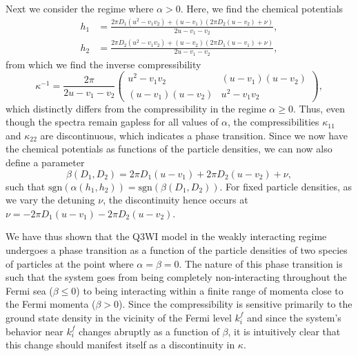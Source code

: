 \documentclass[aps,pra,
superscriptaddress,
reprint,twocolumn,preprintnumbers,
amsmath,amssymb,
nofootinbib]{revtex4-1}
\begin{document}
Next we consider the regime where $\alpha>0$. Here, we find the chemical potentials
        \begin{align}
        h_1 & =  \frac{2 \pi  D_1 \left(u^2-v_1 v_2\right)+\left(u-v_1\right) \left(2 \pi  D_2 \left(u-v_2\right)+\nu \right)}{2 u-v_1-v_2}, \nonumber \\
		h_2 & = \frac{2 \pi  D_2 \left(u^2-v_1 v_2\right)+\left(u-v_2\right) \left(2 \pi  D_1 \left(u-v_1\right)+\nu \right)}{2 u-v_1-v_2},
		\end{align}       
from which we find the inverse compressibility
        \begin{equation}
        \kappa^{-1} = \frac{2\pi}{2u - v_1 - v_2}\left(
        \begin{array}{cc}
        u^2 - v_1 v_2 & (u - v_1)(u - v_2) \\
        (u - v_1)(u - v_2) & u^2 - v_1 v_2
        \end{array}
        \right),
        \end{equation}
which distinctly differs from the compressibility in the regime $\alpha \geq 0$. Thus, even though the spectra remain gapless for all values of $\alpha$, the compressibilities $\kappa_{11}$ and $\kappa_{22}$ are discontinuous, which indicates a phase transition. Since we now have the chemical potentials as functions of the particle densities, we can now also define a parameter
        \begin{equation}
        \beta(D_1,D_2) = 2\pi D_1 (u - v_1) + 2\pi D_2 (u - v_2) + \nu ,
        \end{equation}
such that $\text{sgn}\left(\alpha(h_1,h_2)\right) = \text{sgn}\left(\beta(D_1,D_2)\right)$. For fixed particle densities, as we vary the detuning $\nu$, the discontinuity hence occurs at $\nu = -2\pi D_1 (u - v_1) - 2\pi D_2 (u - v_2)$.

We have thus shown that the Q3WI model in the weakly interacting regime undergoes a phase transition as a function of the particle densities of two species of particles at the point where $\alpha=\beta=0$. The nature of this phase transition is such that the system goes from being completely non-interacting throughout the Fermi sea ($\beta \leq 0$) to being interacting within a finite range of momenta close to the Fermi momenta ($\beta > 0$). Since the compressibility is sensitive primarily to the ground state density in the vicinity of the Fermi level $k_i^f$ and since the system's behavior near $k_i^f$ changes abruptly as a function of $\beta$, it is intuitively clear that this change should manifest itself as a discontinuity in $\kappa$.
\end{document}
